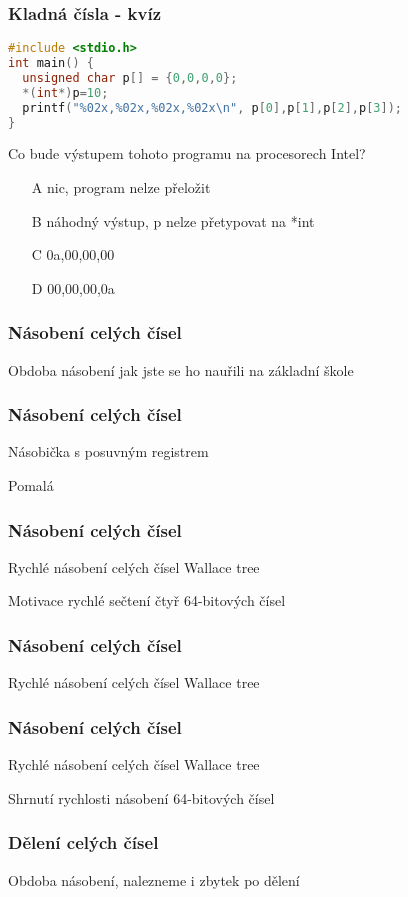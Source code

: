 \documentclass{beamer}
\begin{document}
\begin{frame}[fragile]
\frametitle{Kladná čísla - kvíz}
\begin{lstlisting}[language={C},columns=flexible]
#include <stdio.h>
int main() {
  unsigned char p[] = {0,0,0,0};
  *(int*)p=10;
  printf("%02x,%02x,%02x,%02x\n", p[0],p[1],p[2],p[3]);
}
\end{lstlisting}

Co bude výstupem tohoto programu na procesorech Intel?
\begin{itemize}
\item[A] nic, program nelze přeložit
\item[B] náhodný výstup, p  nelze přetypovat na *int
\item[C] 0a,00,00,00 
\item[D] 00,00,00,0a
\end{itemize}
\end{frame}



\begin{frame}
\frametitle{Násobení celých čísel}

Obdoba násobení jak jste se ho nauřili na základní škole
\end{frame}

\begin{frame}
\frametitle{Násobení celých čísel}

Násobička s posuvným registrem

Pomalá
\end{frame}


\begin{frame}
\frametitle{Násobení celých čísel}

Rychlé násobení celých čísel Wallace tree

Motivace rychlé sečtení čtyř 64-bitových čísel
\end{frame}

\begin{frame}
\frametitle{Násobení celých čísel}

Rychlé násobení celých čísel Wallace tree
\end{frame}

\begin{frame}
\frametitle{Násobení celých čísel}

Rychlé násobení celých čísel Wallace tree

Shrnutí rychlosti násobení 64-bitových čísel
\end{frame}


\begin{frame}
\frametitle{Dělení celých čísel}

Obdoba násobení, nalezneme i zbytek po dělení

\end{frame}
\end{document}
